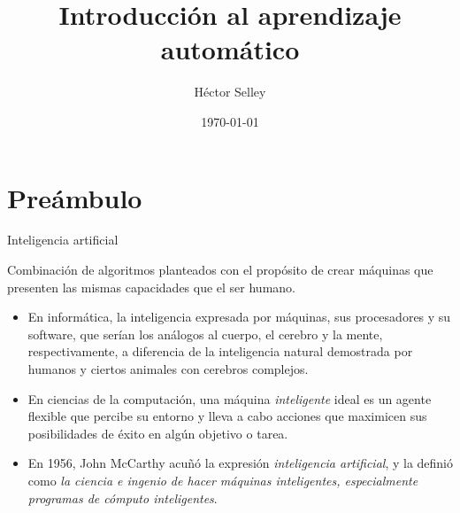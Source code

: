 \documentclass[11pt,aspectratio=169]{beamer}
\author{Héctor Selley}
\title{Introducción al aprendizaje automático}
\institute{Universidad Anáhuac México}
\date{\today}
\begin{document}

\begin{frame}
	\titlepage
\end{frame}

\begin{frame}
	\tableofcontents
\end{frame}

\section{Preámbulo}
\begin{frame}{Inteligencia artificial}\pause
\begin{block}{}
Combinación de algoritmos planteados con el propósito de crear máquinas que presenten las mismas capacidades que el ser humano.
\end{block}\pause
\begin{itemize}
	\item En informática, la inteligencia expresada por máquinas, sus procesadores y su software, que serían los análogos al cuerpo, el cerebro y 
		la mente, respectivamente, a diferencia de la inteligencia natural demostrada por humanos y ciertos animales con cerebros complejos.\pause
	\item En ciencias de la computación, una máquina \textit{inteligente} ideal es un agente flexible que percibe su entorno y lleva a cabo acciones que 
		maximicen sus posibilidades de éxito en algún objetivo o tarea.\pause
	\item En 1956, John McCarthy acuñó la expresión \textit{inteligencia artificial}, y la definió como \textit{la ciencia e ingenio de hacer máquinas 
		inteligentes, especialmente programas de cómputo inteligentes}.
\end{itemize}
\end{frame}
\end{document}
